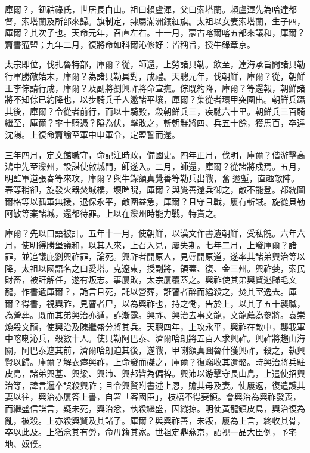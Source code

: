 \begin{pinyinscope}
庫爾？，鈕祜祿氏，世居長白山。祖曰賴盧渾，父曰索塔蘭。賴盧渾先為哈達都督，索塔蘭及所部來歸。旗制定，隸屬滿洲鑲紅旗。太祖以女妻索塔蘭，生子四，庫爾？其次子也。天命元年，召直左右。十一月，蒙古喀爾喀五部來議和，庫爾？齎書蒞盟；九年二月，復將命如科爾沁修好：皆稱旨，授牛錄章京。

太宗即位，伐扎魯特部，庫爾？從，師還，上勞諸貝勒。飲至，達海承旨問諸貝勒行軍勝敵始末，庫爾？為諸貝勒具對，成禮。天聰元年，伐朝鮮，庫爾？從，朝鮮王李倧請行成，庫爾？及副將劉興祚將命宣撫。倧既約降，庫爾？等還報，朝鮮諸將不知倧已約降也，以步騎兵千人邀諸平壤，庫爾？集從者環甲突圍出。朝鮮兵躡其後，庫爾？令從者前行，而以十騎殿，殺朝鮮兵三，疾馳六十里。朝鮮兵三百騎繼至，庫爾？率十騎憑？隘為伏，擊敗之，斬朝鮮將四、兵五十餘，獲馬百，卒達沈陽。上復命齎諭至軍中申軍令，定盟誓而還。

三年四月，定文館職守，命記注時政，備國史。四年正月，伐明，庫爾？偕游擊高鴻中先至灤州，設謀使啟城門，師遂入。二月，師還，庫爾？從諸將戍焉。五月，明監軍道張春等來攻，庫爾？與牛錄額真覺善等勒兵出戰，奮逾塹，直趣敵陣。春等稍卻，旋發火器焚城樓，壞睥睨，庫爾？與覺善還兵御之，敵不能登。都統圖爾格等以孤軍無援，退保永平，敵圍益急，庫爾？且守且戰，屢有斬馘。旋從貝勒阿敏等棄諸城，還都待罪。上以在灤州時能力戰，特貰之。

庫爾？先以口語被訐。五年十一月，使朝鮮，以漢文作書遺朝鮮，受私餽。六年六月，使明得勝堡議和，以其人來，上召入見，屢失期。七年二月，上發庫爾？諸罪，並追議庇劉興祚罪，論死。興祚者開原人，見辱開原道，遂率其諸弟興治等以降，太祖以國語名之曰愛塔。克遼東，授副將，領蓋、復、金三州。興祚婪，索民財畜，被訐解任，遂有叛志。事屢敗，太宗屢覆蓋之。興祚使其弟興賢逃歸毛文龍，作書遺庫爾？，詭言且死，託以營葬，誑瞽者醉而縊殺之，焚其室逸去。庫爾？得書，視興祚，見瞽者尸，以為興祚也，持之慟，告於上，以其子五十襲職，為營葬。既而其弟興治亦遁，詐漸露。興祚、興治去事文龍，文龍薦為參將。袁崇煥殺文龍，使興治及陳繼盛分將其兵。天聰四年，上攻永平，興祚在敵中，襲我軍中喀喇沁兵，殺數十人。使貝勒阿巴泰、濟爾哈朗將五百人求興祚。興祚將趨山海關，阿巴泰遮其前，濟爾哈朗迫其後，遂戰，甲喇額真圖魯什獲興祚，殺之，執興賢以歸。庫爾？解衣瘞興祚，上命發而磔之，庫爾？復竊收其遺骼。時興治將兵駐皮島，諸弟興基、興梁、興沛、興邦皆為偏裨。興沛以游擊守長山島，上遣使招興治等，諱言邏卒誤殺興祚；且令興賢附書述上恩，贍其母及妻。使屢返，復遣護其妻以往，興治亦屢答上書，自署「客國臣」，枝梧不得要領。會興治為興祚發喪，而繼盛信諜言，疑未死，興治忿，執殺繼盛，因縱掠。明使黃龍鎮皮島，興治復為亂，被殺。上亦殺興賢及其諸子。庫爾？與興祚善，未叛，屢為上言，終收其骨，卒以此及。上猶念其有勞，命毋籍其家。世祖定鼎燕京，詔視一品大臣例，予宅地、奴僕。


\end{pinyinscope}
